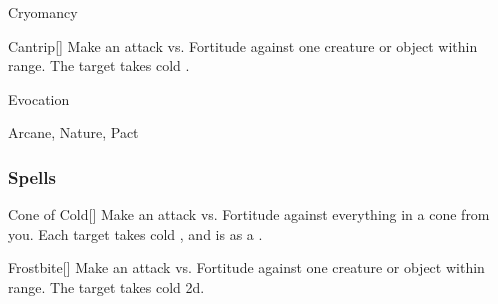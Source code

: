 \newpage
\begin{spellsection}{Cryomancy}

\begin{spellheader}
\end{spellheader}


\begin{ability}{Cantrip}[]
Make an attack vs. Fortitude against one creature or object within \rngmed range.
\hit The target takes cold .
\end{ability}




 Evocation

 Arcane, Nature, Pact
\end{spellsection}


\subsubsection{Spells}


\begin{ability}[\nth{1}]{Cone of Cold}[]
Make an attack vs. Fortitude against everything in a \areamed cone from you.
\hit Each target takes cold , and is  as a .
\end{ability}
\vspace{0.25em}



\begin{ability}[\nth{1}]{Frostbite}[]
Make an attack vs. Fortitude against one creature or object within \rngmed range.
\hit The target takes cold  \plus2d.
\end{ability}
\vspace{0.25em}



